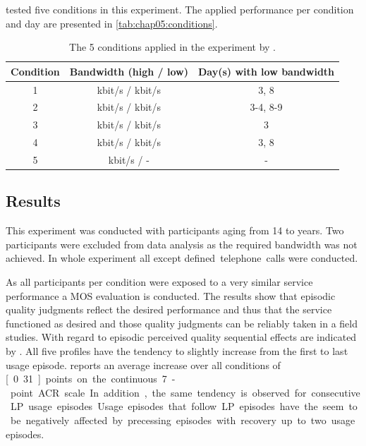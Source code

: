 \cite{moller_single-call_2011} tested five conditions in this experiment.
The applied performance per condition and day are presented in \autoref{tab:chap05:conditions}.

\begin{table}[h]
	\centering
	\begin{tabular}{|c||c|c|}
	Condition & Bandwidth (high / low) & Day(s) with low bandwidth \\
	\hline
	1 & \unit[500]{kbit/s} / \unit[32]{kbit/s} & 3, 8 \\
	2 & \unit[500]{kbit/s} / \unit[32]{kbit/s} & 3-4, 8-9 \\
	3 & \unit[500]{kbit/s} / \unit[32]{kbit/s} & 3 \\
	4 & \unit[150]{kbit/s} / \unit[32]{kbit/s} & 3, 8 \\
	5 & \unit[500]{kbit/s} / - & - \\
	\hline
	\end{tabular}
	\caption{The 5 conditions applied in the experiment by \cite{moller_single-call_2011}.}
	\label{tab:chap05:conditions}
\end{table}

\subsection{Results}
This experiment was conducted with \unit[58]{participants} aging from 14 to \unit[64]{years}.%
Two participants were excluded from data analysis as the required bandwidth was not achieved.
In whole experiment all except \unit[6]{defined telephone calls} were conducted.

As all participants per condition were exposed to a very similar service performance a \ac{MOS} evaluation is conducted.
The results show that episodic quality judgments reflect the desired performance and thus that the service functioned as desired and those quality judgments can be reliably taken in a field studies.
With regard to episodic perceived quality sequential effects are indicated by  \cite{moller_single-call_2011}.
All five profiles have the tendency to slightly increase from the first to last usage episode.
\cite{moller_single-call_2011} reports an average increase over all conditions of \unit[0.31]{points} on the continuous 7-point \ac{ACR} scale.
In addition, the same tendency is observed for consecutive \ac{LP} usage episodes.
Usage episodes that follow \ac{LP} episodes have the seem to be negatively affected by precessing  episodes with recovery up to two usage episodes.

